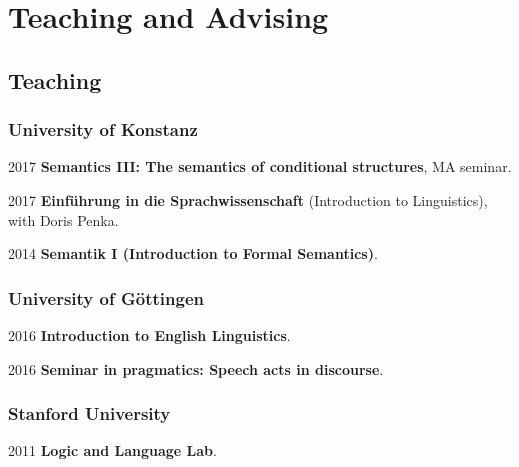 \section*{Teaching and Advising}
\subsection*{Teaching}
\subsubsection*{University of Konstanz}
\begin{dated}
	\item[2017]
		\textbf{Semantics III: The semantics of conditional structures},
		MA seminar.
	\item[2017]
		\textbf{Einf\"uhrung in die Sprachwissenschaft} (Introduction to Linguistics), 
		with Doris Penka.
	\item[2014]
		\textbf{Semantik I (Introduction to Formal Semantics)}.
\end{dated}
\subsubsection*{University of G\"ottingen}
\begin{dated}
	\item[2016] \textbf{Introduction to English Linguistics}.
	\item[2016] \textbf{Seminar in pragmatics: Speech acts in discourse}.
\end{dated}
\subsubsection*{Stanford University}
\begin{dated}
	\item[2011] \textbf{Logic and Language Lab}.
\end{dated}
